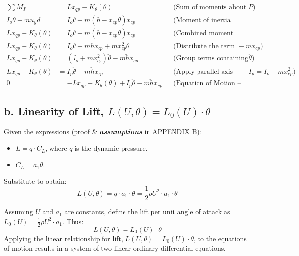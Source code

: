 \documentclass{article}
\begin{document}
\begin{align}
    \sum M_P &= L x_{qp} - K_{\theta} (\theta) && \text{(Sum of moments about } P\text{)} \label{eq:moment_sum} \\
    I_o \ddot{\theta} - m \ddot{u}_y d &= I_o \ddot{\theta} - m (\ddot{h} - x_{cp} \ddot{\theta}) x_{cp} && \text{(Moment of inertia relation)} \label{eq:inertia_rel} \\
    L x_{qp} - K_{\theta} (\theta) &= I_o \ddot{\theta} - m (\ddot{h} - x_{cp} \ddot{\theta}) x_{cp} && \text{(Combined moment equation)} \label{eq:moment_combined} \\
    L x_{qp} - K_{\theta} (\theta) &= I_o \ddot{\theta} - m \ddot{h} x_{cp} + m x_{cp}^2 \ddot{\theta} && \text{(Distribute the term } -m x_{cp}\text{)} \label{eq:moment_distribute} \\
    L x_{qp} - K_{\theta} (\theta) &= (I_o + m x_{cp}^2) \ddot{\theta} - m \ddot{h} x_{cp} && \text{(Group terms containing } \ddot{\theta}\text{)} \label{eq:moment_group} \\
    L x_{qp} - K_{\theta} (\theta) &= I_p \ddot{\theta} - m \ddot{h} x_{cp} && \text{(Apply parallel axis theorem: } I_p = I_o + m x_{cp}^2\text{)} \label{eq:pitch_motion_na} \\
    0 &= -L x_{qp} + K_{\theta} (\theta) + I_p \ddot{\theta} - m \ddot{h} x_{cp} && \text{(Equation of Motion -- Pitch)} \label{eq:pitch_motion} %
\end{align}

\newpage
\subsection{b. Linearity of Lift, $L(U, \theta) = L_0(U) \cdot \theta$}

Given the expressions (proof \& \textbf{\textit{assumptions}} in APPENDIX B):
\begin{itemize}[noitemsep]
    \item $L = q \cdot C_L$, where $q$ is the dynamic pressure.
    \item $C_L = a_1 \theta$.
\end{itemize}

\noindent Substitute to obtain:
\begin{equation}
L(U, \theta) = q \cdot a_1 \cdot \theta = \frac{1}{2} \rho U^2 \cdot a_1 \cdot \theta
\label{eq:lift_basic}
\end{equation}

\noindent Assuming $U$ and $a_1$ are constants, define the lift per unit angle of attack as $L_0(U) = \frac{1}{2} \rho U^2 \cdot a_1$. Thus:
\begin{equation}
L(U, \theta) = L_0(U) \cdot \theta
\label{eq:lift_linear_form}
\end{equation}
Applying the linear relationship for lift, $L(U, \theta) = L_0(U) \cdot \theta$, to the equations of motion results in a system of two linear ordinary differential equations.
\end{document}
